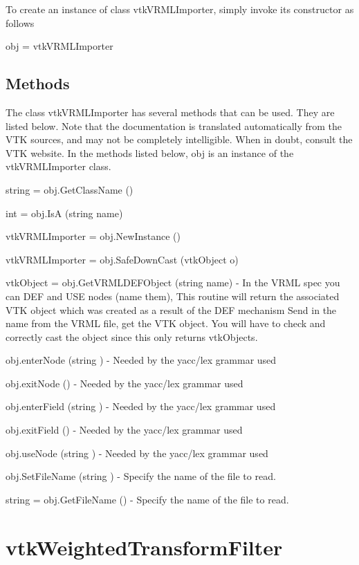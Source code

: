 To create an instance of class vtk\-V\-R\-M\-L\-Importer, simply invoke its constructor as follows \begin{DoxyVerb}  obj = vtkVRMLImporter
\end{DoxyVerb}
 \hypertarget{vtkwidgets_vtkxyplotwidget_Methods}{}\subsection{Methods}\label{vtkwidgets_vtkxyplotwidget_Methods}
The class vtk\-V\-R\-M\-L\-Importer has several methods that can be used. They are listed below. Note that the documentation is translated automatically from the V\-T\-K sources, and may not be completely intelligible. When in doubt, consult the V\-T\-K website. In the methods listed below, {\ttfamily obj} is an instance of the vtk\-V\-R\-M\-L\-Importer class. 
\begin{DoxyItemize}
\item {\ttfamily string = obj.\-Get\-Class\-Name ()}  
\item {\ttfamily int = obj.\-Is\-A (string name)}  
\item {\ttfamily vtk\-V\-R\-M\-L\-Importer = obj.\-New\-Instance ()}  
\item {\ttfamily vtk\-V\-R\-M\-L\-Importer = obj.\-Safe\-Down\-Cast (vtk\-Object o)}  
\item {\ttfamily vtk\-Object = obj.\-Get\-V\-R\-M\-L\-D\-E\-F\-Object (string name)} -\/ In the V\-R\-M\-L spec you can D\-E\-F and U\-S\-E nodes (name them), This routine will return the associated V\-T\-K object which was created as a result of the D\-E\-F mechanism Send in the name from the V\-R\-M\-L file, get the V\-T\-K object. You will have to check and correctly cast the object since this only returns vtk\-Objects.  
\item {\ttfamily obj.\-enter\-Node (string )} -\/ Needed by the yacc/lex grammar used  
\item {\ttfamily obj.\-exit\-Node ()} -\/ Needed by the yacc/lex grammar used  
\item {\ttfamily obj.\-enter\-Field (string )} -\/ Needed by the yacc/lex grammar used  
\item {\ttfamily obj.\-exit\-Field ()} -\/ Needed by the yacc/lex grammar used  
\item {\ttfamily obj.\-use\-Node (string )} -\/ Needed by the yacc/lex grammar used  
\item {\ttfamily obj.\-Set\-File\-Name (string )} -\/ Specify the name of the file to read.  
\item {\ttfamily string = obj.\-Get\-File\-Name ()} -\/ Specify the name of the file to read.  
\end{DoxyItemize}\hypertarget{vtkhybrid_vtkweightedtransformfilter}{}\section{vtk\-Weighted\-Transform\-Filter}\label{vtkhybrid_vtkweightedtransformfilter}
